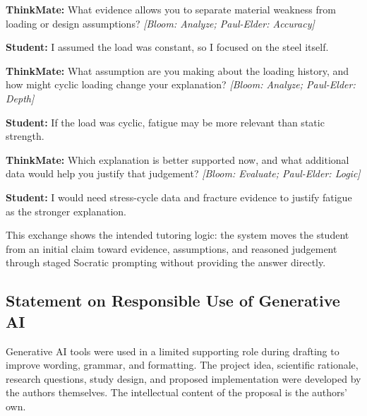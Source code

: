 \documentclass[11pt,a4paper]{article}
\begin{document}
\noindent\textbf{ThinkMate:} What evidence allows you to separate material weakness from loading or design assumptions? \textit{[Bloom: Analyze; Paul-Elder: Accuracy]}

\noindent\textbf{Student:} I assumed the load was constant, so I focused on the steel itself.

\noindent\textbf{ThinkMate:} What assumption are you making about the loading history, and how might cyclic loading change your explanation? \textit{[Bloom: Analyze; Paul-Elder: Depth]}

\noindent\textbf{Student:} If the load was cyclic, fatigue may be more relevant than static strength.

\noindent\textbf{ThinkMate:} Which explanation is better supported now, and what additional data would help you justify that judgement? \textit{[Bloom: Evaluate; Paul-Elder: Logic]}

\noindent\textbf{Student:} I would need stress-cycle data and fracture evidence to justify fatigue as the stronger explanation.

\vspace{0.3cm}
\noindent This exchange shows the intended tutoring logic: the system moves the student from an initial claim toward evidence, assumptions, and reasoned judgement through staged Socratic prompting without providing the answer directly.

\subsection*{Statement on Responsible Use of Generative AI}

Generative AI tools were used in a limited supporting role during drafting to improve wording, grammar, and formatting. The project idea, scientific rationale, research questions, study design, and proposed implementation were developed by the authors themselves. The intellectual content of the proposal is the authors' own.
\end{document}
